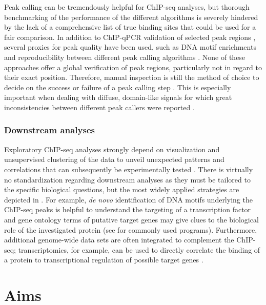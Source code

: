 Peak calling can be tremendously helpful for ChIP-seq analyses, but thorough benchmarking of the performance of the different algorithms is severely hindered by the lack of a comprehensive list of true binding sites that could be used for a fair comparison. In addition to ChIP-qPCR validation of selected peak regions \citep{Laajala2009}, several proxies for peak quality have been used, such as DNA motif enrichments \citep{Wilbanks2010} and reproducibility between different peak calling algorithms \citep{Laajala2009}. None of these approaches offer a global verification of peak regions, particularly not in regard to their exact position. Therefore, manual inspection is still the method of choice to decide on the success or failure of a peak calling step \citep{Rye2011}. This is especially important when dealing with diffuse, domain-like signals for which great inconsistencies between different peak callers were reported \citep{Ho2011}. 
%
\subsubsection{Downstream analyses}
Exploratory ChIP-seq analyses strongly depend on visualization and unsupervised clustering of the data to unveil unexpected patterns and correlations that can subsequently be experimentally tested \citep{Ramirez2014}. There is virtually no standardization regarding downstream analyses as they must be tailored to the specific biological questions, but the most widely applied strategies are depicted in . For example, \textit{de novo} identification of DNA motifs underlying the ChIP-seq peaks is helpful to understand the targeting of a transcription factor \citep{Machanick2011} and gene ontology terms of putative target genes may give clues to the biological role of the investigated protein \citep{Huang2009, Welch2014} (see  for commonly used programs). Furthermore, additional genome-wide data sets are often integrated to complement the ChIP-seq; transcriptomics, for example, can be used to directly correlate the binding of a protein to transcriptional regulation of possible target genes \citep{Chelmicki2014}.
%
\section{Aims}


